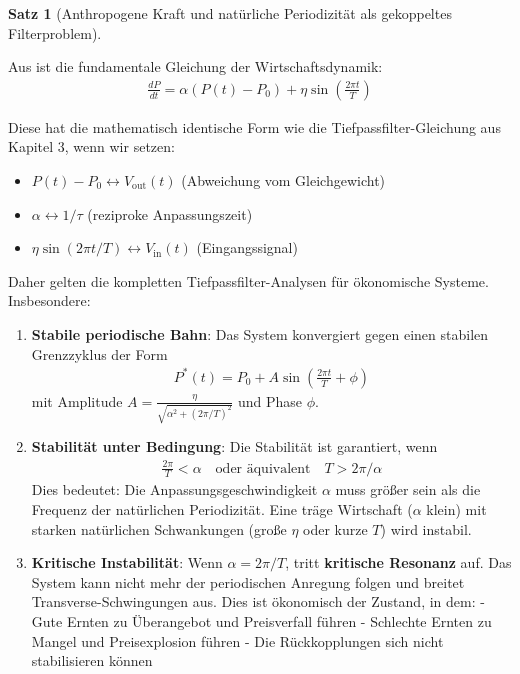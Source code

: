 \documentclass[a4paper, 12pt, twoside, openright]{report}
\theoremstyle{definition}
\theoremstyle{definition}
\newtheorem{satz}{Satz}[chapter]
\begin{document}
\begin{satz}[Anthropogene Kraft und natürliche Periodizität als gekoppeltes Filterproblem]
\label{satz:zwei_kraefte_resonanz}

Aus \cite{epp_signal} ist die fundamentale Gleichung der Wirtschaftsdynamik:
\begin{align}
\frac{dP}{dt} = \alpha(P(t) - P_0) + \eta \sin\left(\frac{2\pi t}{T}\right)
\end{align}

Diese hat die mathematisch identische Form wie die Tiefpassfilter-Gleichung aus Kapitel 3, wenn wir setzen:
\begin{itemize}
\item $P(t) - P_0 \leftrightarrow V_{\text{out}}(t)$  (Abweichung vom Gleichgewicht)
\item $\alpha \leftrightarrow 1/\tau$ (reziproke Anpassungszeit)
\item $\eta \sin(2\pi t/T) \leftrightarrow V_{\text{in}}(t)$ (Eingangssignal)
\end{itemize}

Daher gelten die kompletten Tiefpassfilter-Analysen für ökonomische Systeme. Insbesondere:

\begin{enumerate}

\item \textbf{Stabile periodische Bahn}: Das System konvergiert gegen einen stabilen Grenzzyklus der Form
\begin{align}
P^*(t) = P_0 + A \sin\left(\frac{2\pi t}{T} + \phi\right)
\end{align}
mit Amplitude $A = \frac{\eta}{\sqrt{\alpha^2 + (2\pi/T)^2}}$ und Phase $\phi$.

\item \textbf{Stabilität unter Bedingung}: Die Stabilität ist garantiert, wenn
\begin{align}
\frac{2\pi}{T} < \alpha \quad \text{oder äquivalent} \quad T > 2\pi / \alpha
\end{align}
Dies bedeutet: Die Anpassungsgeschwindigkeit $\alpha$ muss größer sein als die Frequenz der natürlichen Periodizität. Eine träge Wirtschaft ($\alpha$ klein) mit starken natürlichen Schwankungen (große $\eta$ oder kurze $T$) wird instabil.

\item \textbf{Kritische Instabilität}: Wenn $\alpha = 2\pi/T$, tritt \textbf{kritische Resonanz} auf. Das System kann nicht mehr der periodischen Anregung folgen und breitet Transverse-Schwingungen aus. Dies ist ökonomisch der Zustand, in dem:\newline
- Gute Ernten zu Überangebot und Preisverfall führen
- Schlechte Ernten zu Mangel und Preisexplosion führen
- Die Rückkopplungen sich nicht stabilisieren können


\end{enumerate}
\end{satz}
\end{document}
